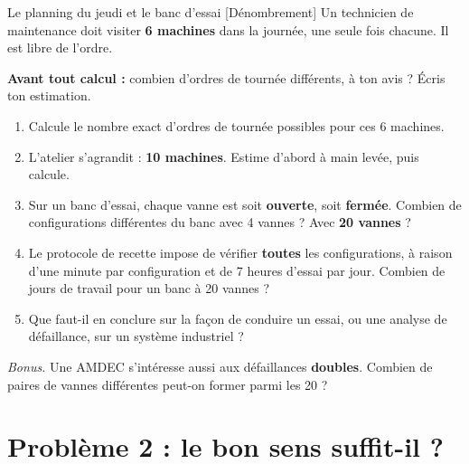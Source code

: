 \documentclass[a4paper,11pt]{article}
\begin{document}
\begin{exo}{Le planning du jeudi et le banc d'essai \hfill \normalfont\color{uimmlightblue}[Dénombrement]}
Un technicien de maintenance doit visiter \textbf{6 machines} dans la journée, une seule fois chacune. Il est libre de l'ordre.

\begin{intuition}
\textbf{Avant tout calcul :} combien d'ordres de tournée différents, à ton avis ? Écris ton estimation. \dotfill
\end{intuition}

\begin{enumerate}
  \item Calcule le nombre exact d'ordres de tournée possibles pour ces 6 machines.
  \item L'atelier s'agrandit : \textbf{10 machines}. Estime d'abord à main levée, puis calcule.
  \item Sur un banc d'essai, chaque vanne est soit \textbf{ouverte}, soit \textbf{fermée}. Combien de configurations différentes du banc avec 4 vannes ? Avec \textbf{20 vannes} ?
  \item Le protocole de recette impose de vérifier \textbf{toutes} les configurations, à raison d'une minute par configuration et de 7 heures d'essai par jour. Combien de jours de travail pour un banc à 20 vannes ?
  \item Que faut-il en conclure sur la façon de conduire un essai, ou une analyse de défaillance, sur un système industriel ?
\end{enumerate}

\vspace{4pt}
\textit{Bonus.} Une AMDEC s'intéresse aussi aux défaillances \textbf{doubles}. Combien de paires de vannes différentes peut-on former parmi les 20 ?
\end{exo}

\newpage
\section{Problème 2 : le bon sens suffit-il ?}
\end{document}
